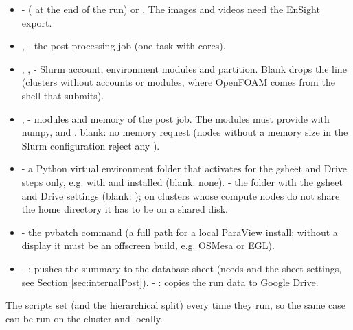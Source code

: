\begin{itemize}
    \item {} -  ( at the end of the run) or . The images and videos need the EnSight export.
    \item {},  - the post-processing job (one task with  cores).
    \item {}, ,  - Slurm account, environment modules and partition. Blank drops the line (clusters without accounts or modules, where OpenFOAM comes from the shell that submits).
    \item {},  - modules and memory of the post job. The modules must provide  with numpy,  and .  blank: no memory request (nodes without a memory size in the Slurm configuration reject any ).
    \item {} - a Python virtual environment folder that  activates for the gsheet and Drive steps only, e.g.  with  and  installed (blank: none).  - the folder with the gsheet and Drive settings (blank: ); on clusters whose compute nodes do not share the home directory it has to be on a shared disk.
    \item {} - the pvbatch command (a full path for a local ParaView install; without a display it must be an offscreen build, e.g. OSMesa or EGL).
    \item {} - :  pushes the summary to the database sheet (needs  and the sheet settings, see Section \ref{sec:internalPost}).  - :  copies the run data to Google Drive.
\end{itemize}
The scripts set  (and the hierarchical split) every time they run, so the same case can be run on the cluster and locally.

